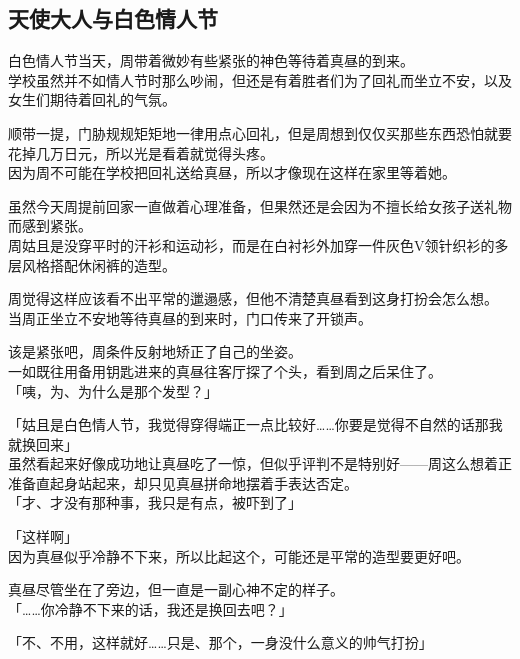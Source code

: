 \subsection{天使大人与白色情人节}

白色情人节当天，周带着微妙有些紧张的神色等待着真昼的到来。\\

学校虽然并不如情人节时那么吵闹，但还是有着胜者们为了回礼而坐立不安，以及女生们期待着回礼的气氛。

顺带一提，门胁规规矩矩地一律用点心回礼，但是周想到仅仅买那些东西恐怕就要花掉几万日元，所以光是看着就觉得头疼。\\

因为周不可能在学校把回礼送给真昼，所以才像现在这样在家里等着她。

虽然今天周提前回家一直做着心理准备，但果然还是会因为不擅长给女孩子送礼物而感到紧张。\\

周姑且是没穿平时的汗衫和运动衫，而是在白衬衫外加穿一件灰色V领针织衫的多层风格搭配休闲裤的造型。

周觉得这样应该看不出平常的邋遢感，但他不清楚真昼看到这身打扮会怎么想。\\

当周正坐立不安地等待真昼的到来时，门口传来了开锁声。

该是紧张吧，周条件反射地矫正了自己的坐姿。\\

一如既往用备用钥匙进来的真昼往客厅探了个头，看到周之后呆住了。\\

「咦，为、为什么是那个发型？」

「姑且是白色情人节，我觉得穿得端正一点比较好……你要是觉得不自然的话那我就换回来」\\

虽然看起来好像成功地让真昼吃了一惊，但似乎评判不是特别好——周这么想着正准备直起身站起来，却只见真昼拼命地摆着手表达否定。\\

「才、才没有那种事，我只是有点，被吓到了」

「这样啊」\\

因为真昼似乎冷静不下来，所以比起这个，可能还是平常的造型要更好吧。

真昼尽管坐在了旁边，但一直是一副心神不定的样子。\\

「……你冷静不下来的话，我还是换回去吧？」

「不、不用，这样就好……只是、那个，一身没什么意义的帅气打扮」

